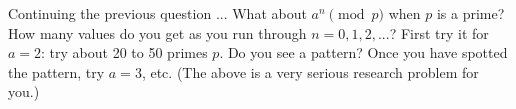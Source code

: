   Continuing the previous question ...
    What about $a^n \pmod{p}$ when $p$ is a prime?
    How many values do you get as you run through $n = 0, 1, 2, ...$?
    First try it for $a = 2$: try about 20 to 50 primes $p$.
    Do you see a pattern? 
    Once you have spotted the pattern, try $a = 3$, etc.
(The above is a very serious research problem for you.)
